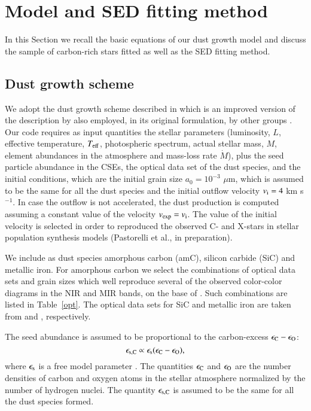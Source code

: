 \documentclass[useAMS,usenatbib]{mn2e/mn2e}
\begin{document}
\section{Model and SED fitting method}\label{model}
In this Section we recall the basic equations of our dust growth model and discuss the sample of carbon-rich stars fitted as well as the SED fitting method.

\subsection{Dust growth scheme}
We adopt the dust growth scheme described in \citet{Nanni13, Nanni14} which is an improved version of the description by \citet{FG06} also employed, in its original formulation, by other groups \citep{Ventura12,Ventura14, Ventura16,Dellagli15b, Dellagli15a}.
Our code requires as input quantities the stellar parameters (luminosity, $L$, effective temperature, $T_{\rm eff}$, photospheric spectrum, actual stellar mass, $M$, element abundances in the atmosphere and mass-loss rate $\dot{M}$), plus the seed particle abundance in the CSEs, the optical data set of the dust species, and the initial conditions, which are the initial grain size $a_0=10^{-3}$ $\mu$m, which is assumed to be the same for all the dust species and the initial outflow velocity $v_{\rm i}= 4$ km s$^{-1}$. In case the outflow is not accelerated, the dust production is computed assuming a constant value of the velocity $v_{\rm exp}=v_{\rm i}$. The value of the initial velocity is selected in order to reproduced the observed C- and X-stars in stellar population synthesis models (Pastorelli et al., in preparation).

We include as dust species amorphous carbon (amC), silicon carbide (SiC) and metallic iron. 
For amorphous carbon we select the combinations of optical data sets and grain sizes which well reproduce several of the observed color-color diagrams in the NIR and MIR bands, on the base of \citet{Nanni16}. Such combinations are listed in Table~\ref{opt}.
The optical data sets for SiC and metallic iron are taken from \citet{Pegourie88} and \citet{Leksina67}, respectively.

The seed abundance is assumed to be proportional to the carbon-excess $\epsilon_{\rm C}-\epsilon_{\rm O}$:
\begin{equation}\label{n_seeds}
\epsilon_{\rm s, C}\propto\epsilon_{\rm s} (\epsilon_{\rm C}-\epsilon_{\rm O}),
\end{equation}
%
where $\epsilon_{\rm s}$ is a free model parameter \citep{Nanni16}. 
The quantities $\epsilon_{\rm C}$ and $\epsilon_{\rm O}$ are the number densities of carbon and oxygen atoms in the stellar atmosphere normalized by the number of hydrogen nuclei.
The quantity $\epsilon_{\rm s, C}$
is assumed to be the same for all the dust species formed.
\end{document}

